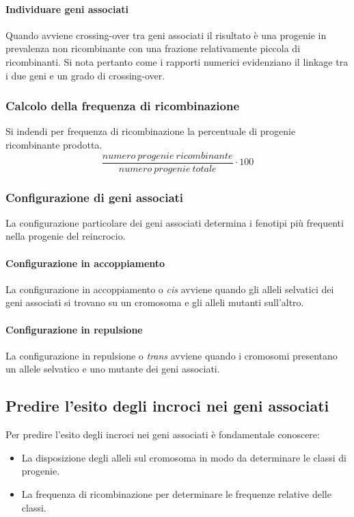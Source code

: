 			\paragraph{Individuare geni associati}
			Quando avviene crossing-over tra geni associati il risultato \`e una progenie in prevalenza non ricombinante con una frazione relativamente piccola di ricombinanti.
			Si nota pertanto come i rapporti numerici evidenziano il linkage tra i due geni e un grado di crossing-over.

		\subsubsection{Calcolo della frequenza di ricombinazione}
		Si indendi per frequenza di ricombinazione la percentuale di progenie ricombinante prodotta.
		\[\dfrac{numero\ progenie\ ricombinante}{numero\ progenie\ totale}\cdot 100\]

		\subsubsection{Configurazione di geni associati}
		La configurazione particolare dei geni associati determina i fenotipi pi\`u frequenti nella progenie del reincrocio.

			\paragraph{Configurazione in accoppiamento}
			La configurazione in accoppiamento o \emph{cis} avviene quando gli alleli selvatici dei geni associati si trovano su un cromosoma e gli alleli mutanti sull'altro.

			\paragraph{Configurazione in repulsione}
			La configurazione in repulsione o \emph{trans} avviene quando i cromosomi presentano un allele selvatico e uno mutante dei geni associati.

				
		\subsection{Predire l'esito degli incroci nei geni associati}
		Per predire l'esito degli incroci nei geni associati \`e fondamentale conoscere:
		\begin{multicols}{2}
			\begin{itemize}
				\item La disposizione degli alleli sul cromosoma in modo da determinare le classi di progenie.
				\item La frequenza di ricombinazione per determinare le frequenze relative delle classi.
			\end{itemize}
		\end{multicols}

